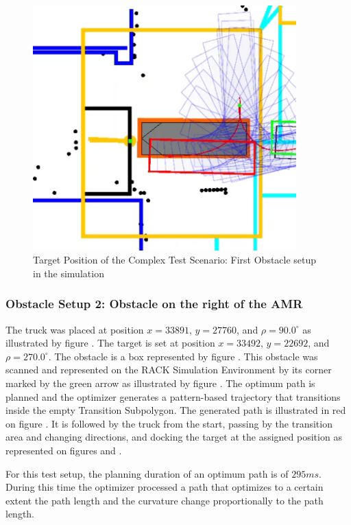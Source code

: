 \begin{figure}[H]
    \begin{center}
        \includegraphics[width=4in]{images/Chap3/Test2_ObsLeftVehic/Target_simu.png} %
        \caption{Target Position of the Complex Test Scenario: First Obstacle setup in the simulation}
        \label{OptResult17}
        \end{center}    
\end{figure}

\subsubsection{Obstacle Setup 2: Obstacle on the right of the AMR}

The truck was placed at position \(x =33891 \), \(y = 27760\), and \(\rho = 90.0^\circ\) as illustrated by figure 
. The target is set at position \(x = 33492\), \(y = 22692\), and \(\rho = 270.0^\circ\).
The obstacle is a box represented by figure . 
This obstacle was scanned and represented on the RACK Simulation 
Environment by its corner marked by the green arrow as illustrated by figure .
The optimum path is planned and the optimizer generates a pattern-based trajectory that transitions
inside the empty Transition Subpolygon. 
The generated path is illustrated in red on figure . It is followed 
by the truck from the start, passing by the transition area and changing directions, and docking the 
target at the assigned position as represented on figures  and . 

For this test setup, the planning duration of an optimum path is of \(295ms\). During this time
the optimizer processed a path that optimizes to a certain extent the path length and 
the curvature change proportionally to the path length.

